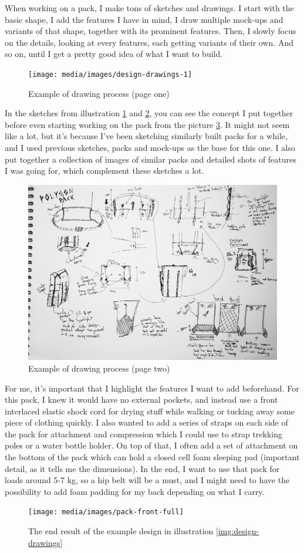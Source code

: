 
When working on a pack, I make tons of sketches and drawings. I start with the basic shape, I add the features I have in mind, I draw multiple mock-ups and variants of that shape, together with its prominent features. Then, I slowly focus on the details, looking at every features, each getting variants of their own. And so on, until I get a pretty good idea of what I want to build.

\begin{figure}[H]
  \texttt{[image: media/images/design-drawings-1]}
  \caption{Example of drawing process (page one)}
  \label{img:design-drawings-1}
\end{figure}

In the sketches from illustration \ref{img:design-drawings-1} and \ref{img:design-drawings-2}, you can see the concept I put together before even starting working on the pack from the picture \ref{img:pack-side-full}. It might not seem like a lot, but it's because I've been sketching similarly built packs for a while, and I used previous sketches, packs and mock-ups as the base for this one. I also put together a collection of images of similar packs and detailed shots of features I was going for, which complement these sketches a lot.

\begin{figure}[H]
  \includegraphics[width=\textwidth]{media/images/design-drawings-2}
  \caption{Example of drawing process (page two)}
  \label{img:design-drawings-2}
\end{figure}

For me, it's important that I highlight the features I want to add beforehand. For this pack, I knew it would have no external pockets, and instead use a front interlaced elastic shock cord for drying stuff while walking or tucking away some piece of clothing quickly. I also wanted to add a series of straps on each side of the pack for attachment and compression which I could use to strap trekking poles or a water bottle holder. On top of that, I often add a set of attachment on the bottom of the pack which can hold a closed cell foam sleeping pad (important detail, as it tells me the dimensions). In the end, I want to use that pack for loads around 5-7 kg, so a hip belt will be a must, and I might need to have the possibility to add foam padding for my back depending on what I carry.

\begin{figure}[H]
  \centering
  \texttt{[image: media/images/pack-front-full]}
  \caption{The end result of the example design in illustration \ref{img:design-drawings}}
  \label{img:pack-side-full}
\end{figure}

